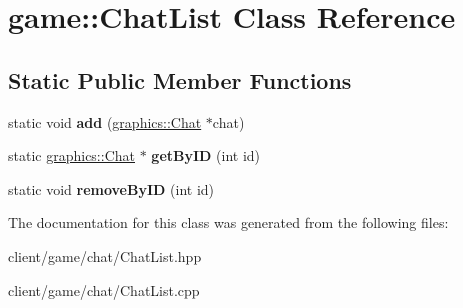 \hypertarget{classgame_1_1_chat_list}{\section{game\-:\-:Chat\-List Class Reference}
\label{classgame_1_1_chat_list}
}
\subsection*{Static Public Member Functions}
\begin{DoxyCompactItemize}
\item 
\hypertarget{classgame_1_1_chat_list_a99498e12ddc1460b5754e249beb287e6}{static void {\bfseries add} (\hyperlink{classgraphics_1_1_chat}{graphics\-::\-Chat} $\ast$chat)}\label{classgame_1_1_chat_list_a99498e12ddc1460b5754e249beb287e6}

\item 
\hypertarget{classgame_1_1_chat_list_a5d792f0774e81fd3e08ffd540ad72ab4}{static \hyperlink{classgraphics_1_1_chat}{graphics\-::\-Chat} $\ast$ {\bfseries get\-By\-I\-D} (int id)}\label{classgame_1_1_chat_list_a5d792f0774e81fd3e08ffd540ad72ab4}

\item 
\hypertarget{classgame_1_1_chat_list_aff5a13152fc6e67bbc47d35b535df901}{static void {\bfseries remove\-By\-I\-D} (int id)}\label{classgame_1_1_chat_list_aff5a13152fc6e67bbc47d35b535df901}

\end{DoxyCompactItemize}


The documentation for this class was generated from the following files\-:\begin{DoxyCompactItemize}
\item 
client/game/chat/Chat\-List.\-hpp\item 
client/game/chat/Chat\-List.\-cpp\end{DoxyCompactItemize}
